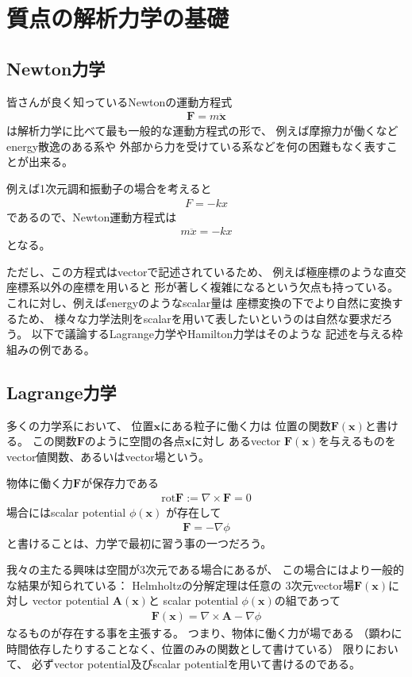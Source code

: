 \section{質点の解析力学の基礎}

\subsection{Newton力学}

皆さんが良く知っているNewtonの運動方程式
\begin{align}
  \bm{F} = m\ddot{\bm{x}}
\end{align}
は解析力学に比べて最も一般的な運動方程式の形で、
例えば摩擦力が働くなどenergy散逸のある系や
外部から力を受けている系などを何の困難もなく表すことが出来る。

例えば1次元調和振動子の場合を考えると
\begin{align}
  F = -k x
\end{align}
であるので、Newton運動方程式は
\begin{align}
  m\ddot{x} = - k x
\end{align}
となる。

ただし、この方程式はvectorで記述されているため、
例えば極座標のような直交座標系以外の座標を用いると
形が著しく複雑になるという欠点も持っている。
これに対し、例えばenergyのようなscalar量は
座標変換の下でより自然に変換するため、
様々な力学法則をscalarを用いて表したいというのは自然な要求だろう。
以下で議論するLagrange力学やHamilton力学はそのような
記述を与える枠組みの例である。

\subsection{Lagrange力学}

多くの力学系において、
位置$\bm{x}$にある粒子に働く力は
位置の関数$\bm{F}(\bm{x})$と書ける。
この関数$\bm{F}$のように空間の各点$\bm{x}$に対し
あるvector $\bm{F}(\bm{x})$を与えるものを
vector値関数、あるいはvector場という。

物体に働く力$\bm{F}$が保存力である
\begin{align}
  \mathrm{rot} \bm{F}
  :=
  \nabla \times \bm{F}
  = 0
\end{align}
場合にはscalar potential $\phi(\bm{x})$
が存在して
\begin{align}
  \bm{F} = -\nabla \phi
\end{align}
と書けることは、力学で最初に習う事の一つだろう。

我々の主たる興味は空間が3次元である場合にあるが、
この場合にはより一般的な結果が知られている：
Helmholtzの分解定理は任意の
3次元vector場$\bm{F}(\bm{x})$に対し
vector potential $\bm{A}(\bm{x})$と
scalar potential $\phi(\bm{x})$の組であって
\begin{align}
  \bm{F}(\bm{x}) = \nabla \times \bm{A} - \nabla \phi
\end{align}
なるものが存在する事を主張する。
つまり、物体に働く力が場である
（顕わに時間依存したりすることなく、位置のみの関数として書けている）
限りにおいて、
必ずvector potential及びscalar potentialを用いて書けるのである。

